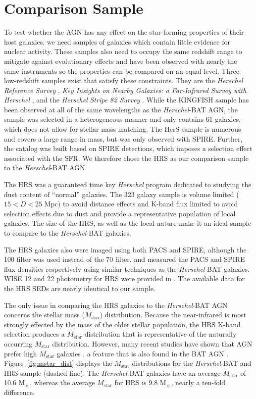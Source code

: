 \documentclass[fleqn, usenatbib]{mnras}
\newcommand{\herschel}{\emph{Herschel}}
\newcommand{\msun}{M$_{\sun}$}
\newcommand{\mstar}{$M_{\mathrm{star}}$}
\begin{document}
\section{Comparison Sample}
To test whether the AGN has any effect on the star-forming properties of their host galaxies, we need samples of galaxies which contain little evidence for nuclear activity. These samples also need to occupy the same redshift range to mitigate against evolutionary effects and have been observed with nearly the same instruments so the properties can be compared on an equal level. Three low-redshift samples exist that satisfy these constraints. They are the  \herschel{} \textit{Reference Survey} \cite[HRS;][]{Boselli:2010fj}, \textit{Key Insights on Nearby Galaxies: a Far-Infrared Survey with Herschel} \cite[KINGFISH;][]{Kennicutt:2011vn}, and the \herschel{} \textit{Stripe 82 Survey} \citep[HerS;][]{Viero:2014jk}. While the KINGFISH sample has been observed at all of the same wavelengths as the \herschel-BAT AGN, the sample was selected in a heterogeneous manner and only contains 61 galaxies, which does not allow for stellar mass matching. The HerS sample is numerous and covers a large range in mass, but was only observed with SPIRE. Further, the catalog was built based on SPIRE detections, which imposes a selection effect associated with the SFR. We therefore chose the HRS as our comparison sample to the \herschel-BAT AGN.

The HRS was a guaranteed time key \herschel{} program dedicated to studying the dust content of ``normal'' galaxies. The 323 galaxy sample is volume limited ($15< D < 25$ Mpc) to avoid distance effects and K-band flux limited to avoid selection effects due to dust and provide a representative population of local galaxies. The size of the HRS, as well as the local nature make it an ideal sample to compare to the \herschel-BAT galaxies.

The HRS galaxies also were imaged using both PACS and SPIRE, although the 100 \micron{} filter was used instead of the 70 \micron{} filter. \citet{Cortese:2014qq} and \citet{Ciesla:2012lq} measured the PACS and SPIRE flux densities respectively using similar techniques as the \herschel-BAT galaxies. WISE 12 and 22 \micron{} photometry for HRS were provided in \citet{Ciesla:2014qy}. The available data for the HRS SEDs are nearly identical to our sample. 

The only issue in comparing the HRS galaxies to the \herschel-BAT AGN concerns the stellar mass (\mstar) distribution. Because the near-infrared is most strongly effected by the mass of the older stellar population, the HRS K-band selection produces a \mstar{} distribution that is representative of the naturally occurring \mstar{} distribution. However, many recent studies have shown that AGN prefer high \mstar{} galaxies \citep[e.g.][]{Schawinski:2010zr,Xue:2010fj}, a feature that is also found in the BAT AGN \citep{Koss:2011vn}. Figure~\ref{fig:mstar_dist} displays the \mstar{} distributions for the \herschel-BAT and HRS sample (dashed line). The \herschel-BAT galaxies have an average \mstar{} of 10.6 \msun, whereas the average \mstar{} for HRS is 9.8 \msun, nearly a ten-fold difference. 
\end{document}
